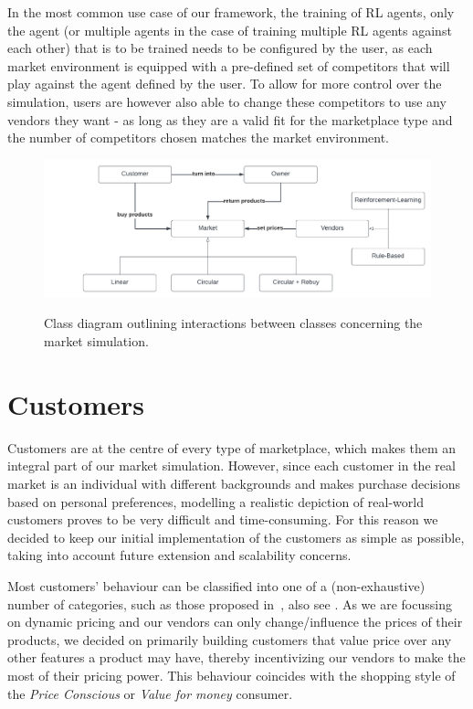 In the most common use case of our framework, the training of RL agents, only the agent (or multiple agents in the case of training multiple RL agents against each other) that is to be trained needs to be configured by the user, as each market environment is equipped with a pre-defined set of competitors that will play against the agent defined by the user. To allow for more control over the simulation, users are however also able to change these competitors to use any vendors they want - as long as they are a valid fit for the marketplace type and the number of competitors chosen matches the market environment.

\begin{figure}[t]
	\centering
	\includegraphics[width = \textwidth]{images/overview_diagram.pdf}\\
	\caption{Class diagram outlining interactions between classes concerning the market simulation.\\}\label{fig:OverviewDiagram}
\end{figure}

\section{Customers}\label{sec:Customers}

Customers are at the centre of every type of marketplace, which makes them an integral part of our market simulation. However, since each customer in the real market is an individual with different backgrounds and makes purchase decisions based on personal preferences, modelling a realistic depiction of real-world customers proves to be very difficult and time-consuming. For this reason we decided to keep our initial implementation of the customers as simple as possible, taking into account future extension and scalability concerns.

Most customers' behaviour can be classified into one of a (non-exhaustive) number of categories, such as those proposed in~\cite{ShoppingStyles}, also see . As we are focussing on dynamic pricing and our vendors can only change/influence the prices of their products, we decided on primarily building customers that value price over any other features a product may have, thereby incentivizing our vendors to make the most of their pricing power. This behaviour coincides with the shopping style of the \emph{Price Conscious} or \emph{Value for money} consumer.

